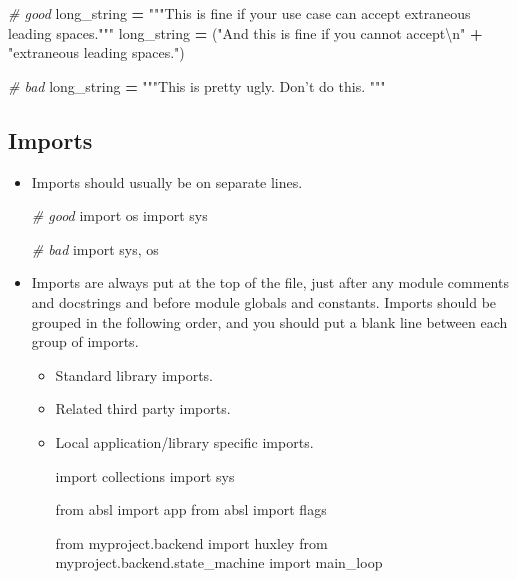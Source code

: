 \documentclass[
]{book}
\newenvironment{Shaded}{\begin{snugshade}}{\end{snugshade}}
\newcommand{\CharTok}[1]{\textcolor[rgb]{0.31,0.60,0.02}{#1}}
\newcommand{\CommentTok}[1]{\textcolor[rgb]{0.56,0.35,0.01}{\textit{#1}}}
\newcommand{\ImportTok}[1]{#1}
\newcommand{\NormalTok}[1]{#1}
\newcommand{\OperatorTok}[1]{\textcolor[rgb]{0.81,0.36,0.00}{\textbf{#1}}}
\newcommand{\StringTok}[1]{\textcolor[rgb]{0.31,0.60,0.02}{#1}}
\begin{document}
\begin{itemize}
\begin{Shaded}
\begin{Highlighting}[]
\CommentTok{# good}
\NormalTok{long_string }\OperatorTok{=} \StringTok{"""This is fine if your use case can accept}
\StringTok{    extraneous leading spaces."""}
\NormalTok{long_string }\OperatorTok{=}\NormalTok{ (}\StringTok{"And this is fine if you cannot accept}\CharTok{\textbackslash{}n}\StringTok{"} \OperatorTok{+}
               \StringTok{"extraneous leading spaces."}\NormalTok{)}

\CommentTok{# bad}
\NormalTok{long_string }\OperatorTok{=} \StringTok{"""This is pretty ugly.}
\StringTok{Don't do this.}
\StringTok{"""}
\end{Highlighting}
\end{Shaded}
\end{itemize}

\hypertarget{imports}{%
\subsection{Imports}\label{imports}}

\begin{itemize}
\item
  Imports should usually be on separate lines.

\begin{Shaded}
\begin{Highlighting}[]
\CommentTok{# good}
\ImportTok{import}\NormalTok{ os}
\ImportTok{import}\NormalTok{ sys}

\CommentTok{# bad}
\ImportTok{import}\NormalTok{ sys, os}
\end{Highlighting}
\end{Shaded}
\item
  Imports are always put at the top of the file, just after any module comments
  and docstrings and before module globals and constants. Imports should be
  grouped in the following order, and you should put a blank line between each
  group of imports.

  \begin{itemize}
  \item
    Standard library imports.
  \item
    Related third party imports.
  \item
    Local application/library specific imports.

\begin{Shaded}
\begin{Highlighting}[]
\ImportTok{import}\NormalTok{ collections}
\ImportTok{import}\NormalTok{ sys}

\ImportTok{from}\NormalTok{ absl }\ImportTok{import}\NormalTok{ app}
\ImportTok{from}\NormalTok{ absl }\ImportTok{import}\NormalTok{ flags}

\ImportTok{from}\NormalTok{ myproject.backend }\ImportTok{import}\NormalTok{ huxley}
\ImportTok{from}\NormalTok{ myproject.backend.state_machine }\ImportTok{import}\NormalTok{ main_loop}
\end{Highlighting}
\end{Shaded}
  \end{itemize}
\end{itemize}
\end{document}
